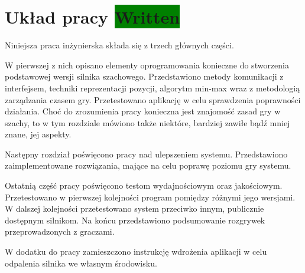 \section{Układ pracy \colorbox{green}{Written}}
\label{sec:uklad-pracy}

Niniejsza praca inżynierska składa się z trzech głównych części.

W pierwszej z nich opisano elementy oprogramowania konieczne do stworzenia podstawowej wersji silnika szachowego.
Przedstawiono metody komunikacji z interfejsem, techniki reprezentacji pozycji, algorytm min-max wraz z metodologią zarządzania czasem gry.
Przetestowano aplikację w celu sprawdzenia poprawności działania.
Choć do zrozumienia pracy konieczna jest znajomość zasad gry w szachy, to w tym rozdziale mówiono także niektóre, bardziej zawiłe bądź mniej znane, jej aspekty.

Następny rozdział poświęcono pracy nad ulepszeniem systemu.
Przedstawiono zaimplementowane rozwiązania, mające na celu poprawę poziomu gry systemu.

Ostatnią część pracy poświęcono testom wydajnościowym oraz jakościowym.
Przetestowano w pierwszej kolejności program pomiędzy różnymi jego wersjami.
W dalszej kolejności przetestowano system przeciwko innym, publicznie dostępnym silnikom.
Na końcu przedstawiono podsumowanie rozgrywek przeprowadzonych z graczami.

W dodatku do pracy zamieszczono instrukcję wdrożenia aplikacji w celu odpalenia silnika we własnym środowisku.